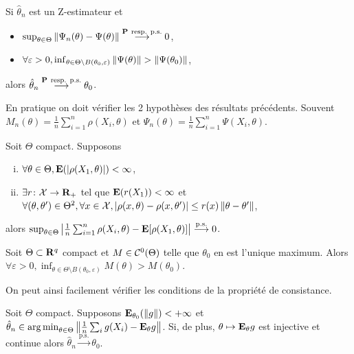 	\begin{pop}
		Si $\hat{\theta}_n$ est un Z-estimateur et
		\begin{itemize}
			\item[\textbullet] $\sup_{\theta \in \Theta} \left\lVert \Psi_n(\theta) - \Psi(\theta) \right\rVert \overset{\mathbf{P}\ \text{resp. p.s.}}{\longrightarrow} 0$,
			\item[\textbullet] $\forall \varepsilon > 0, \inf_{\theta \in \Theta \setminus B(\theta_0,\varepsilon)} \left\lVert\Psi(\theta)\right\rVert > \left\lVert\Psi(\theta_0)\right\rVert$,
		\end{itemize}
		alors $\hat{\theta}_n \overset{\proba\ \text{resp. p.s.}}{\longrightarrow} \theta_0$.
	\end{pop}
	
	En pratique on doit vérifier les 2 hypothèses des résultats précédents.
	Souvent $M_n(\theta) = \frac{1}{n} \sum_{i = 1}^n \rho(X_i,\theta)$ et $\Psi_n(\theta) = \frac{1}{n} \sum_{i = 1}^n \Psi(X_i,\theta)$.

	\begin{lem}
		Soit $\Theta$ compact.
		Supposons
		\begin{enumerate}[(i)]
			\item $\forall \theta \in \Theta, \mathbf{E}(\left\lvert\rho(X_1,\theta)\right\rvert) < \infty$,
			\item $\exists r \colon \mathcal{X} \to \mathbf{R}_+$ tel que $\mathbf{E}(r(X_1)) < \infty$ et $\forall (\theta,\theta') \in \Theta^2, \forall x \in \mathcal{X}, \left\lvert\rho(x,\theta) - \rho(x,\theta')\right\rvert \leq r(x) \left\lVert\theta - \theta'\right\rVert$,
		\end{enumerate}
		alors $\sup_{\theta \in \Theta} \left\lvert\frac{1}{n} \sum_{i = 1}^n \rho(X_i,\theta) - \mathbf{E}[\rho(X_1,\theta)]\right\rvert \overset{\text{p.s.}}{\longrightarrow} 0$.
	\end{lem}

	\begin{lem}
		Soit $\Theta \subset \mathbf{R}^q$ compact et $M \in \mathcal{C}^0(\Theta)$ telle que $\theta_0$ en est l'unique maximum.
		Alors $\forall \varepsilon > 0, \inf_{\theta \in \Theta \setminus B(\theta_0,\varepsilon)} M(\theta) > M(\theta_0)$.
	\end{lem}
	
	On peut ainsi facilement vérifier les conditions de la propriété de consistance.

	\begin{pop}
		Soit $\Theta$ compact.
		Supposons $\mathbf{E}_{\theta_0} (\left\lVert g\right\rVert) < +\infty$ et $\hat{\theta}_n \in \operatorname{arg\, min}_{\theta \in \Theta} \left\lVert\frac{1}{n} \sum_i g(X_i) - \mathbf{E}_{\theta} g\right\rVert$.
		Si, de plus, $\theta \mapsto \mathbf{E}_{\theta} g$ est injective et continue alors $\hat{\theta}_n \overset{\text{p.s.}}{\longrightarrow} \theta_0$.
	\end{pop}


